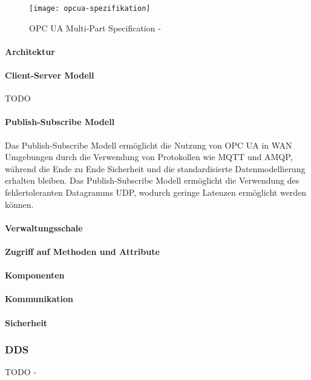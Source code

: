 \begin{figure}[h]
  \centering
  \texttt{[image: opcua-spezifikation]}
  \caption{OPC UA Multi-Part Specification - \cite{opcpt1}} 
  \label{Kap2:OPC UA Multi-Part Specification}
\end{figure}

\clearpage

\paragraph{Architektur}
\paragraph{Client-Server Modell}
TODO

\paragraph{Publish-Subscribe Modell}
Das Publish-Subscribe Modell ermöglicht die Nutzung von \ac{OPC UA} in \ac{WAN} Umgebungen durch die Verwendung von Protokollen wie \ac{MQTT} und \ac{AMQP}, während die Ende zu Ende Sicherheit und die standardisierte Datenmodellierung erhalten bleiben. Das Publish-Subscribe Modell ermöglicht die Verwendung des fehlertoleranten Datagramms \ac{UDP}, wodurch geringe Latenzen ermöglicht werden können. 

\paragraph{Verwaltungsschale}
\paragraph{Zugriff auf Methoden und Attribute}

\paragraph{Komponenten}
\paragraph{Kommunikation}
\paragraph{Sicherheit}

\subsubsection{DDS}
TODO - 

